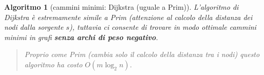 \documentclass[oneside]{book}
\newtheorem{alg}{Algoritmo}
\begin{document}
\begin{alg}[cammini minimi: Dijkstra (uguale a Prim)]
  L'algoritmo di Dijkstra \`e estremamente simile a Prim (attenzione al calcolo
  della distanza dei nodi dalla sorgente $s$), tuttavia ci consente di trovare
  in modo ottimale cammini minimi in grafi \textbf{senza archi di peso negativo}.

  \begin{algorithm}[H]
  \end{algorithm}
  \begin{quote}
    Proprio come Prim (cambia solo il calcolo della distanza tra i nodi) questo
    algoritmo ha costo $O(m \log_2 n)$.
  \end{quote}
\end{alg}
\end{document}
